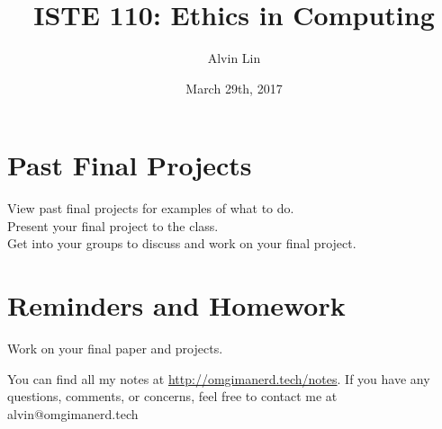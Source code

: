 \documentclass[letterpaper, 12pt]{article}
\title{ISTE 110: Ethics in Computing}
\author{Alvin Lin}
\date{March 29th, 2017}
\begin{document}
\maketitle

\section*{Past Final Projects}
View past final projects for examples of what to do. \\
Present your final project to the class. \\
Get into your groups to discuss and work on your final project.

\section*{Reminders and Homework}
Work on your final paper and projects.

\begin{center}
  You can find all my notes at \url{http://omgimanerd.tech/notes}. If you have
  any questions, comments, or concerns, feel free to contact me at
  alvin@omgimanerd.tech
\end{center}
\end{document}
